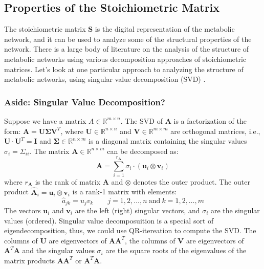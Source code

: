 \documentclass{article}[12pt]
\def\R{\mathbb{R}}
\begin{document}
\subsection{Properties of the Stoichiometric Matrix}
The stoichiometric matrix $\mathbf{S}$ is the digital representation of the metabolic network, and it can be used to analyze some of the structural properties of the network.
There is a large body of literature on the analysis of the structure of metabolic networks using various decomposition approaches of stoichiometric matrices. 
Let's look at one particular approach to analyzing the structure of metabolic networks, using singular value decomposition (SVD) \cite{Famili:2003aa}.

\subsubsection{Aside: Singular Value Decomposition?}
Suppose we have a matrix $A \in \R^{m \times n}$. The SVD of $\mathbf{A}$ is a factorization of the form: $\mathbf{A} = \mathbf{U}\mathbf{\Sigma}\mathbf{V}^{T}$, where
$\mathbf{U}\in\mathbb{R}^{n\times{n}}$ and $\mathbf{V}\in\mathbb{R}^{m\times{m}}$ are orthogonal matrices, i.e., $\mathbf{U}\cdot\mathbf{U}^{T} = \mathbf{I}$ and $\mathbf{\Sigma}\in\mathbb{R}^{n\times{m}}$ is a diagonal matrix containing 
the singular values $\sigma_{i}=\Sigma_{ii}$. The matrix $\mathbf{A}\in\mathbb{R}^{n\times{m}}$ can be decomposed as:
\begin{equation*}
\mathbf{A} = \sum_{i=1}^{r_{\mathbf{A}}}\sigma_{i}\cdot\left(\mathbf{u}_{i}\otimes\mathbf{v}_{i}\right)
\end{equation*}
where $r_{\mathbf{A}}$ is the rank of matrix $\mathbf{A}$ and $\otimes$ denotes the outer product. 
The outer product $\hat{\mathbf{A}}_{i} = \mathbf{u}_{i}\otimes\mathbf{v}_{i}$ is a rank-1 matrix with elements: 
\begin{equation*}
\hat{a}_{jk} = u_{j}v_{k}\qquad{j=1,2,\dots,n~\text{and}~k=1,2,\dots,m}
\end{equation*}
The vectors $\mathbf{u}_{i}$ and $\mathbf{v}_{i}$ are the left (right) singular vectors, 
and $\sigma_{i}$ are the singular values (ordered). Singular value decomposuition is a special sort of eigendecomposition, thus, we could use QR-itereation to compute the SVD.
The columns of $\mathbf{U}$ are eigenvectors of $\mathbf{A}\mathbf{A}^{T}$, 
the columns of $\mathbf{V}$ are eigenvectors of $\mathbf{A}^{T}\mathbf{A}$ and
the singular values $\sigma_{i}$ are the square roots of the eigenvalues of the matrix products $\mathbf{A}\mathbf{A}^{T}$ or $\mathbf{A}^{T}\mathbf{A}$. 
\end{document}
